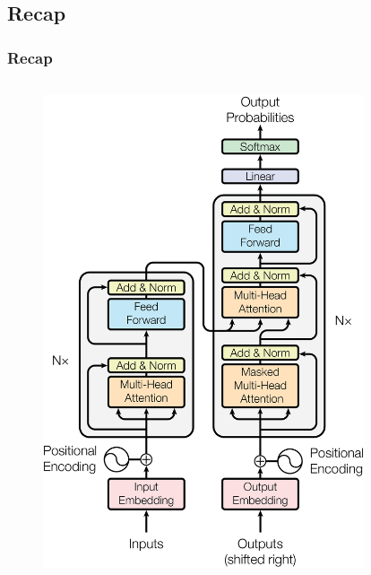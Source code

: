 \documentclass[]{beamer}
\begin{document}
\subsection{Recap}
\begin{frame}
    \frametitle{Recap}
    \begin{columns}
        \begin{column}[]{0.5\textwidth}
            \begin{figure}[r]
                \includegraphics[scale = 0.4]{ModalNet-21.png}
            \end{figure}
        \end{column}
        \begin{column}[]{0.5\textwidth}
            \begin{figure}[r]

\end{figure}
\end{column}
\end{columns}
\end{frame}
\end{document}
